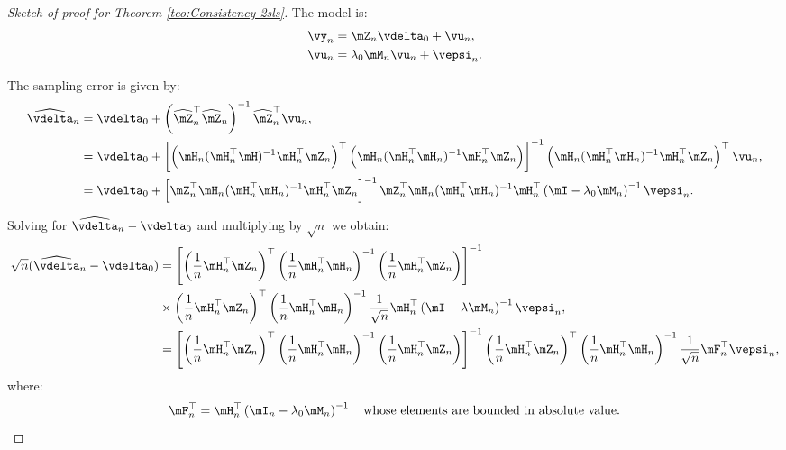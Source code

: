 \documentclass[english,12pt]{book}\usepackage[]{graphicx}\usepackage[]{xcolor}
\begin{document}
\begin{proof}[Sketch of proof for Theorem \ref{teo:Consistency-2sls}]
The model is:
\begin{equation*}
\begin{aligned}
	\vy_n & = \mZ_n\vdelta_0 + \vu_n,\\
	\vu_n & = \lambda_0 \mM_n \vu_n + \vepsi_n.
\end{aligned}
\end{equation*}


The sampling error is given by:
\begin{equation*}
  \begin{aligned}
     \widehat{\vdelta}_n & =  \vdelta_0 + \left(\widehat{\mZ}^\top_n\widehat{\mZ}_n\right)^{-1}\widehat{\mZ}^\top_n\vu_n, \\
     & = \vdelta_0 + \left[\left(\mH_n(\mH_n^\top\mH)^{-1}\mH_n^\top\mZ_n\right)^\top\left(\mH_n(\mH^\top_n\mH_n)^{-1}\mH^\top_n\mZ_n\right)\right]^{-1}\left(\mH_n(\mH_n^\top\mH_n)^{-1}\mH_n^\top\mZ_n\right)^\top\vu_n,\\
     & = \vdelta_0 + \left[\mZ^\top_n \mH_n (\mH^\top_n\mH_n)^{-1}\mH^\top_n\mZ_n\right]^{-1}\mZ^\top_n\mH_n(\mH^\top_n\mH_n)^{-1}\mH^\top_n\left(\mI -\lambda_0\mM_n\right)^{-1}\vepsi_n.
  \end{aligned}
\end{equation*}

Solving for $\widehat{\vdelta}_{n} - \vdelta_0$ and multiplying by $\sqrt{n}$ we obtain:
\begin{equation*}
\begin{aligned}
\sqrt{n}(\widehat{\vdelta}_{n} - \vdelta_0) & = \left[\left(\frac{1}{n}\mH^\top_n\mZ_n \right)^\top\left(\frac{1}{n}\mH^\top_n\mH_n\right)^{-1}\left(\frac{1}{n}\mH^\top_n\mZ_n \right)\right]^{-1} \\
& \times \left(\frac{1}{n}\mH^\top_n\mZ_n \right)^\top\left(\frac{1}{n}\mH^\top_n\mH_n\right)^{-1}\frac{1}{\sqrt{n}}\mH^\top_n\left(\mI -\lambda\mM_n\right)^{-1}\vepsi_n, \\
             & = \left[\left(\frac{1}{n}\mH^\top_n\mZ_n \right)^\top\left(\frac{1}{n}\mH^\top_n\mH_n\right)^{-1}\left(\frac{1}{n}\mH^\top_n\mZ_n \right)\right]^{-1}\left(\frac{1}{n}\mH^\top_n\mZ_n \right)^\top\left(\frac{1}{n}\mH^\top_n\mH_n\right)^{-1}\frac{1}{\sqrt{n}}\mF_n^\top\vepsi_n,
\end{aligned}
\end{equation*}
%
where:
\begin{equation*}
\mF_n^\top = \mH^\top_n\left(\mI_n -\lambda_0\mM_n\right)^{-1} \quad \mbox{whose elements are bounded in absolute value.}
\end{equation*}


\end{proof}
\end{document}
